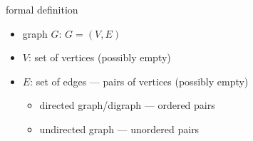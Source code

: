 \begin{frame}{formal definition}
\begin{itemize}
\item graph $G$: $G = (V,E)$
\item $V$: set of vertices (possibly empty)
\item $E$: set of edges --- pairs of vertices (possibly empty)
    \begin{itemize}
    \item directed graph/digraph --- ordered pairs
    \item undirected graph --- unordered pairs
    \end{itemize}
\end{itemize}
\end{frame}
